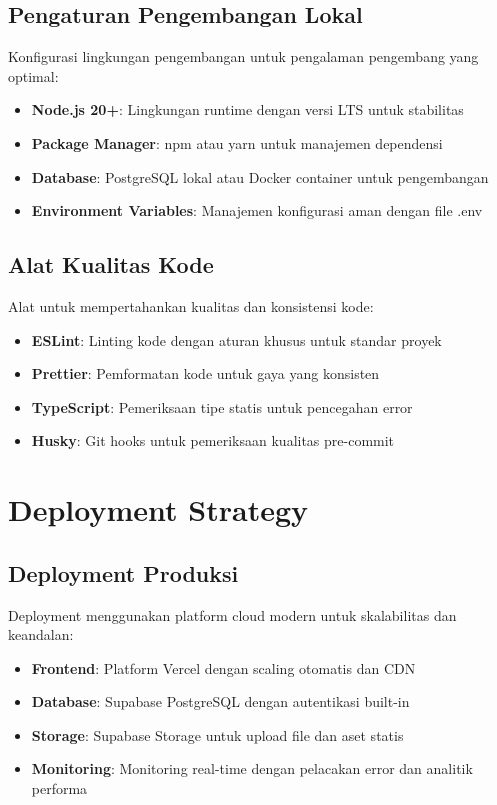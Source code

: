 \subsection{Pengaturan Pengembangan Lokal}

Konfigurasi lingkungan pengembangan untuk pengalaman pengembang yang optimal:

\begin{itemize}
\item \textbf{Node.js 20+}: Lingkungan runtime dengan versi LTS untuk stabilitas
\item \textbf{Package Manager}: npm atau yarn untuk manajemen dependensi
\item \textbf{Database}: PostgreSQL lokal atau Docker container untuk pengembangan
\item \textbf{Environment Variables}: Manajemen konfigurasi aman dengan file .env
\end{itemize}

\subsection{Alat Kualitas Kode}

Alat untuk mempertahankan kualitas dan konsistensi kode:

\begin{itemize}
\item \textbf{ESLint}: Linting kode dengan aturan khusus untuk standar proyek
\item \textbf{Prettier}: Pemformatan kode untuk gaya yang konsisten
\item \textbf{TypeScript}: Pemeriksaan tipe statis untuk pencegahan error
\item \textbf{Husky}: Git hooks untuk pemeriksaan kualitas pre-commit
\end{itemize}

\section{Deployment Strategy}

\subsection{Deployment Produksi}

Deployment menggunakan platform cloud modern untuk skalabilitas dan keandalan:

\begin{itemize}
\item \textbf{Frontend}: Platform Vercel dengan scaling otomatis dan CDN
\item \textbf{Database}: Supabase PostgreSQL dengan autentikasi built-in
\item \textbf{Storage}: Supabase Storage untuk upload file dan aset statis
\item \textbf{Monitoring}: Monitoring real-time dengan pelacakan error dan analitik performa
\end{itemize}


